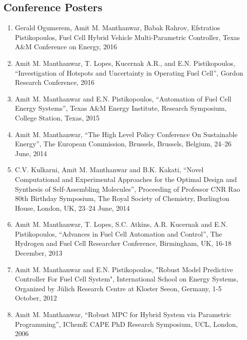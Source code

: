 \documentclass[10pt]{article}
\begin{document}
\subsection{Conference Posters}
\begin{enumerate}[nosep]
\item Gerald Ogumerem, Amit M. Manthanwar, Babak Rahrov, Efstratios Pistikopoulos, Fuel Cell Hybrid Vehicle Multi-Parametric Controller, Texas A\&M Conference on Energy, 2016

\item Amit M. Manthanwar, T. Lopes, Kucernak A.R., and E.N. Pistikopoulos, ``Investigation of Hotspots and Uncertainty in Operating Fuel Cell'', Gordon Research Conference, 2016

\item Amit M. Manthanwar and E.N. Pistikopoulos, ``Automation of Fuel Cell Energy Systems'', Texas A\&M Energy Institute, Research Symposium, College Station, Texas, 2015

\item Amit M. Manthanwar, ``The High Level Policy Conference On Sustainable Energy'', The European Commission, Brussels, Brussels, Belgium, 24–26 June, 2014

\item C.V. Kulkarni, Amit M. Manthanwar and B.K. Kakati, ``Novel  Computational and Experimental Approaches for the Optimal Design and Synthesis of Self-Assembling Molecules'', Proceeding of Professor CNR Rao 80th Birthday Symposium, The Royal Society of Chemistry, Burlington House, London, UK, 23–24 June, 2014

\item Amit M. Manthanwar, T. Lopes, S.C. Atkins, A.R. Kucernak and E.N. Pistikopoulos, ``Advances in Fuel Cell Automation and Control'', The Hydrogen and Fuel Cell Researcher Conference, Birmingham, UK, 16-18 December, 2013

\item Amit M. Manthanwar and E.N. Pistikopoulos, "Robust Model Predictive Controller For Fuel Cell System", International School on Energy Systems, Organized by Jülich Research Centre at Kloster Seeon, Germany, 1-5 October, 2012

\item Amit M. Manthanwar, ``Robust MPC for Hybrid System via Parametric Programming'', IChemE CAPE PhD Research Symposium, UCL, London, 2006
\end{enumerate}
\end{document}

